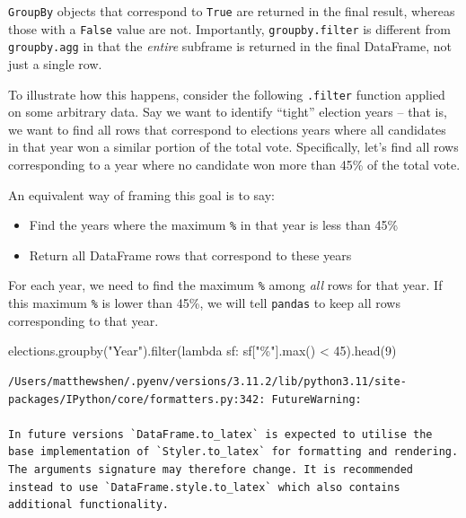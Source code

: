 \documentclass[
  letterpaper,
  DIV=11,
  numbers=noendperiod]{scrreprt}
\newenvironment{Shaded}{\begin{snugshade}}{\end{snugshade}}
\newcommand{\BuiltInTok}[1]{\textcolor[rgb]{0.00,0.23,0.31}{#1}}
\newcommand{\DecValTok}[1]{\textcolor[rgb]{0.68,0.00,0.00}{#1}}
\newcommand{\KeywordTok}[1]{\textcolor[rgb]{0.00,0.23,0.31}{#1}}
\newcommand{\NormalTok}[1]{\textcolor[rgb]{0.00,0.23,0.31}{#1}}
\newcommand{\OperatorTok}[1]{\textcolor[rgb]{0.37,0.37,0.37}{#1}}
\newcommand{\StringTok}[1]{\textcolor[rgb]{0.13,0.47,0.30}{#1}}
\providecommand{\tightlist}{%
  \setlength{\itemsep}{0pt}\setlength{\parskip}{0pt}}\usepackage{longtable,booktabs,array}
\begin{document}
\texttt{GroupBy} objects that correspond to \texttt{True} are returned
in the final result, whereas those with a \texttt{False} value are not.
Importantly, \texttt{groupby.filter} is different from
\texttt{groupby.agg} in that the \emph{entire} subframe is returned in
the final DataFrame, not just a single row.

To illustrate how this happens, consider the following \texttt{.filter}
function applied on some arbitrary data. Say we want to identify
``tight'' election years -- that is, we want to find all rows that
correspond to elections years where all candidates in that year won a
similar portion of the total vote. Specifically, let's find all rows
corresponding to a year where no candidate won more than 45\% of the
total vote.

An equivalent way of framing this goal is to say:

\begin{itemize}
\tightlist
\item
  Find the years where the maximum \texttt{\%} in that year is less than
  45\%
\item
  Return all DataFrame rows that correspond to these years
\end{itemize}

For each year, we need to find the maximum \texttt{\%} among \emph{all}
rows for that year. If this maximum \texttt{\%} is lower than 45\%, we
will tell \texttt{pandas} to keep all rows corresponding to that year.

\begin{Shaded}
\begin{Highlighting}[]
\NormalTok{elections.groupby(}\StringTok{"Year"}\NormalTok{).}\BuiltInTok{filter}\NormalTok{(}\KeywordTok{lambda}\NormalTok{ sf: sf[}\StringTok{"\%"}\NormalTok{].}\BuiltInTok{max}\NormalTok{() }\OperatorTok{\textless{}} \DecValTok{45}\NormalTok{).head(}\DecValTok{9}\NormalTok{)}
\end{Highlighting}
\end{Shaded}

\begin{verbatim}
/Users/matthewshen/.pyenv/versions/3.11.2/lib/python3.11/site-packages/IPython/core/formatters.py:342: FutureWarning:

In future versions `DataFrame.to_latex` is expected to utilise the base implementation of `Styler.to_latex` for formatting and rendering. The arguments signature may therefore change. It is recommended instead to use `DataFrame.style.to_latex` which also contains additional functionality.
\end{verbatim}
\end{document}
